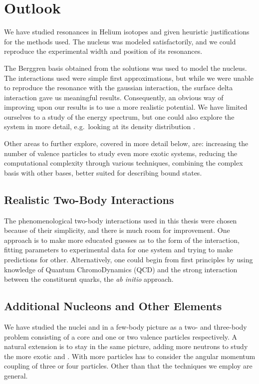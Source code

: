\documentclass[../main/report.tex]{subfiles}
\begin{document}
\chapter{Outlook}
\label{cha:outlook}

We have studied resonances in Helium isotopes and given heuristic justifications for the methods used. The  nucleus was modeled satisfactorily, and we could reproduce the experimental width and position of its resonances.

The Berggren basis obtained from the  solutions was used to model the  nucleus. The interactions used were simple first approximations, but while we were unable to reproduce the  resonance with the gaussian interaction, the surface delta interaction gave us meaningful results.
Consequently, an obvious way of improving upon our results is to use a more realistic potential. 
We have limited ourselves to a study of the energy spectrum, but one could also explore the  system in more detail, e.g.~looking at its density distribution \cite{radii}.

Other areas to further explore, covered in more detail below, are: increasing the number of valence particles to study even more exotic systems, reducing the computational complexity through various techniques, combining the complex basis with other bases, better suited for describing bound states.

\section{Realistic Two-Body Interactions}
The phenomenological two-body interactions used in this thesis were chosen because of their simplicity, and there is much room for improvement. 
One approach is to make more educated guesses as to the form of the interaction, fitting parameters to experimental data for one system and trying to make predictions for other.
Alternatively, one could begin from first principles by using knowledge of Quantum ChromoDynamics (QCD) and the strong interaction between the constituent quarks, the \emph{ab initio} approach.

\section{Additional Nucleons and Other Elements}

We have studied the nuclei  and  in a few-body picture as a two- and three-body problem consisting of a core and one or two valence particles respectively.
A natural extension is to stay in the same picture, adding more neutrons to study the more exotic  and .
With more particles has to consider the angular momentum coupling of three or four particles. Other than that the techniques we employ are general.
\end{document}
